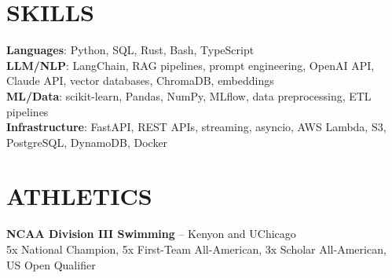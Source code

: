 \documentclass[letterpaper,11pt]{article}
\begin{document}
\section{SKILLS}
 \begin{itemize}[leftmargin=0in, label={}]
    \small{\item{
     \textbf{Languages}{: Python, SQL, Rust, Bash, TypeScript}\vspace{2pt} \\
     \textbf{LLM/NLP}{: LangChain, RAG pipelines, prompt engineering, OpenAI API, Claude API, vector databases, ChromaDB, embeddings}\vspace{2pt} \\
     \textbf{ML/Data}{: scikit-learn, Pandas, NumPy, MLflow, data preprocessing, ETL pipelines}\vspace{2pt} \\
     \textbf{Infrastructure}{: FastAPI, REST APIs, streaming, asyncio, AWS Lambda, S3, PostgreSQL, DynamoDB, Docker}
    }}
 \end{itemize}

\section{ATHLETICS}
 \begin{itemize}[leftmargin=0in, label={}]
    \small{\item{
     \textbf{NCAA Division III Swimming} -- Kenyon and UChicago \\
     5x National Champion, 5x First-Team All-American, 3x Scholar All-American, US Open Qualifier
    }}
 \end{itemize}

\end{document}
